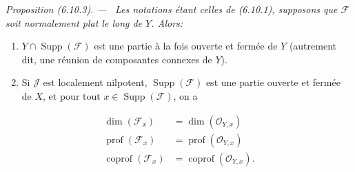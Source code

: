 \documentclass[10pt,oneside]{book}
\newenvironment{proposition}[1][]{%
  \par\medskip\noindent\itshape Proposition (#1). ---\ }{\par}
\begin{document}
\begin{proposition}[6.10.3]
\label{IV.2.s6.10.3-fr}
Les notations étant celles de (6.10.1), supposons que $\mathcal F$ soit
normalement plat le long de $Y$. Alors:
\begin{enumerate}
\item[(i)] $Y\cap\operatorname{Supp}(\mathcal F)$ est une partie à la fois
ouverte et fermée de $Y$ (autrement dit, une réunion de composantes connexes
de $Y$).
\item[(ii)] Si $\mathcal J$ est localement nilpotent,
$\operatorname{Supp}(\mathcal F)$ est une partie ouverte et fermée de $X$, et
pour tout $x\in\operatorname{Supp}(\mathcal F)$, on a
\end{enumerate}
\begin{align}
\dim(\mathcal F_x)&=\dim(\mathcal O_{Y,x})
  \tag{6.10.3.1}\label{IV.2.s6.10.3.1-fr}\\
\operatorname{prof}(\mathcal F_x)&=\operatorname{prof}(\mathcal O_{Y,x})
  \tag{6.10.3.2}\label{IV.2.s6.10.3.2-fr}\\
\operatorname{coprof}(\mathcal F_x)&=\operatorname{coprof}(\mathcal O_{Y,x}).
  \tag{6.10.3.3}\label{IV.2.s6.10.3.3-fr}
\end{align}
\end{proposition}
\end{document}
